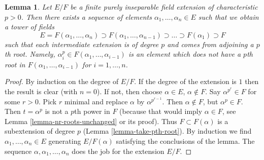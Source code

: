 \documentclass[10pt,a4paper]{amsart}
\theoremstyle{plain}
\newtheorem{lemma}[subsection]{Lemma}
\theoremstyle{definition}
\theoremstyle{remark}
\numberwithin{equation}{subsection}
\begin{document}
\begin{lemma}
\label{lemma-finite-purely-inseparable}
Let $E/F$ be a finite purely inseparable field extension of
characteristic $p > 0$. Then there exists a sequence of elements
$\alpha_1, \ldots, \alpha_n \in E$ such that we obtain a tower
of fields
$$
E = F(\alpha_1, \ldots, \alpha_n) \supset
F(\alpha_1, \ldots, \alpha_{n - 1}) \supset
\ldots
\supset F(\alpha_1) \supset F
$$
such that each intermediate extension is of degree $p$ and comes
from adjoining a $p$th root. Namely,
$\alpha_i^p \in F(\alpha_1, \ldots, \alpha_{i - 1})$
is an element which does not have a $p$th root in
$F(\alpha_1, \ldots, \alpha_{i - 1})$ for $i = 1, \ldots, n$.
\end{lemma}

\begin{proof}
By induction on the degree of $E/F$. If the degree of the extension is $1$
then the result is clear (with $n = 0$). If not, then choose
$\alpha \in E$, $\alpha \not \in F$. Say $\alpha^{p^r} \in F$ for some
$r > 0$. Pick $r$ minimal and replace $\alpha$ by $\alpha^{p^{r - 1}}$.
Then $\alpha \not \in F$, but $\alpha^p \in F$. Then $t = \alpha^p$ is not
a $p$th power in $F$ (because that would imply $\alpha \in F$, see
Lemma \ref{lemma-nr-roots-unchanged} or its proof).
Thus $F \subset F(\alpha)$ is a subextension of degree $p$
(Lemma \ref{lemma-take-pth-root}). By induction we find
$\alpha_1, \ldots, \alpha_n \in E$ generating $E/F(\alpha)$
satisfying the conclusions of the lemma.
The sequence $\alpha, \alpha_1, \ldots, \alpha_n$ does the job
for the extension $E/F$.
\end{proof}
\end{document}
